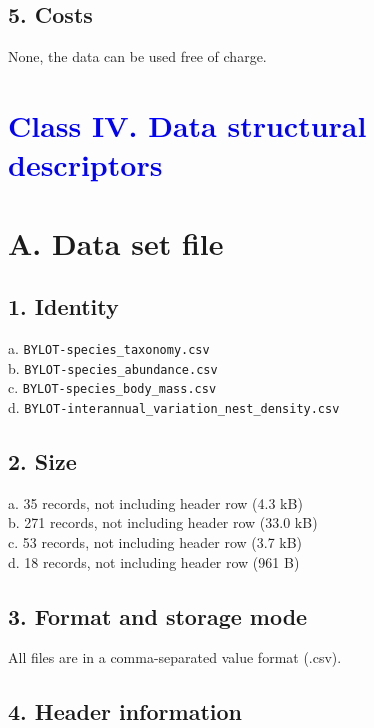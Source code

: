 \documentclass[a4paper,twoside,12pt]{article}
\begin{document}
                \subsection*{5. Costs}
                None, the data can be used free of charge.          
\newpage
    
 \section*{\textcolor{Blue}{Class IV. Data structural descriptors}}
    \section*{A. Data set file}
                        \subsection*{1. Identity} 
                        a. \texttt{BYLOT-species\_taxonomy.csv}\\
                b. \texttt{BYLOT-species\_abundance.csv}\\
                c. \texttt{BYLOT-species\_body\_mass.csv}\\
                        d. \texttt{BYLOT-interannual\_variation\_nest\_density.csv}\\ 
                        
                        \subsection*{2. Size} 
                        a. 35 records, not including header row (4.3 kB)\\
                        b. 271 records, not including header row  (33.0 kB)\\
                        c. 53 records, not including header row  (3.7 kB)\\
                        d. 18 records, not including header row  (961 B)
                        
                        \subsection*{3. Format and storage mode} All files are in a comma-separated value format (.csv). 
      
                        \subsection*{4. Header information} 
\end{document}
